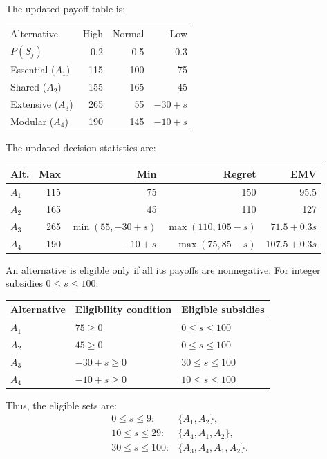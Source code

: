 The updated payoff table is:

\begin{center}\small\setlength{\tabcolsep}{4pt}
	\begin{tabular}{lrrr}\toprule
		Alternative & High & Normal & Low\\
		$P(S_j)$ & 0.2 & 0.5 & 0.3\\ \midrule
				Essential ($A_1$) & 115 & 100 & 75\\
		Shared ($A_2$) & 155 & 165 & 45\\
		Extensive ($A_3$) & 265 & 55 & $-30+s$\\
		Modular ($A_4$) & 190 & 145 & $-10+s$\\
		\bottomrule
	\end{tabular}
\end{center}

The updated decision statistics are:

\begin{center}\small\setlength{\tabcolsep}{4pt}
	\begin{tabular}{lrrrr}\toprule
		Alt. & Max & Min & Regret & EMV\\ \midrule
				$A_1$ & 115 & 75 & 150 & 95.5\\
		$A_2$ & 165 & 45 & 110 & 127\\
		$A_3$ & 265 & $\min(55,-30+s)$ & $\max(110,105-s)$ & $71.5+0.3s$\\
		$A_4$ & 190 & $-10+s$ & $\max(75,85-s)$ & $107.5+0.3s$\\
		\bottomrule
	\end{tabular}
\end{center}

An alternative is eligible only if all its payoffs are nonnegative.
For integer subsidies $0\le s\le100$:

\begin{center}
\begin{tabular}{lll}\toprule
Alternative & Eligibility condition & Eligible subsidies\\\midrule
$A_1$ & $75\ge0$ & $0\le s\le100$\\
$A_2$ & $45\ge0$ & $0\le s\le100$\\
$A_3$ & $-30+s\ge0$ & $30\le s\le100$\\
$A_4$ & $-10+s\ge0$ & $10\le s\le100$\\
\bottomrule
\end{tabular}
\end{center}

Thus, the eligible sets are:
\[
\begin{array}{ll}
0\le s\le9: & \{A_1,A_2\},\\
10\le s\le29: & \{A_4,A_1,A_2\},\\
30\le s\le100: & \{A_3,A_4,A_1,A_2\}.
\end{array}
\]


